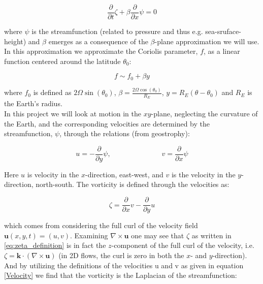 \documentclass[12pt]{article}
\numberwithin{figure}{section}
\numberwithin{table}{section}
\begin{document}
\begin{equation}
	\frac{\partial}{\partial t}\zeta + \beta \frac{\partial}{\partial x} \psi = 0
    \label{Vorticity}
\end{equation}

\noindent where $\psi$ is the streamfunction (related to pressure and thus e.g. sea-sruface-height) and $\beta$ emerges as a consequence of the $\beta$-plane approximation we will use. In this approximation we approximate the Coriolis parameter, $f$, as a linear function centered around the latitude $\theta_0$:     

\begin{equation}
	f \sim f_0 + \beta y
\end{equation}

\noindent where $f_0$ is defined as $2 \Omega \sin(\theta_0)$, $\beta = \frac{2 \Omega \cos(\theta_0)}{R_E}$, $y = R_E(\theta - \theta_0)$ and $R_E$ is the Earth's radius. \\ 


\noindent In this project we will look at motion in the $xy$-plane, neglecting the curvature of the Earth, and the corresponding velocities are determined by the streamfunction, $\psi$, through the relations (from geostrophy)\cite{fluid_dynamics_notes}:

\begin{equation}
	u = - \frac{\partial}{\partial y} \psi, \hspace{3cm} v = \frac{\partial}{\partial x} \psi
    \label{Velocity}
\end{equation}

\noindent Here $u$ is velocity in the $x$-direction, east-west, and $v$ is the velocity in the $y$-direction, north-south. The vorticity is defined through the velocities as:

\begin{equation}
	\zeta = \frac{\partial}{\partial x} v - \frac{\partial}{\partial y} u \label{eq:zeta_definition}
\end{equation}

\noindent which comes from considering the full curl of the velocity field $\mathbf{u}(x,y,t)=(u,v)$. Examining $\nabla\times\mathbf{u}$ one may see that $\zeta$ as written in \eqref{eq:zeta_definition} is in fact the $z$-component of the full curl of the velocity, i.e. $\zeta=\mathbf{k}\cdot(\nabla\times\mathbf{u})$ (in 2D flows, the curl is zero in both the $x$- and $y$-direction). And by utilizing the definitions of the velocities u and v as given in equation \eqref{Velocity} we find that the vorticity is the Laplacian of the streamfunction:
\end{document}
